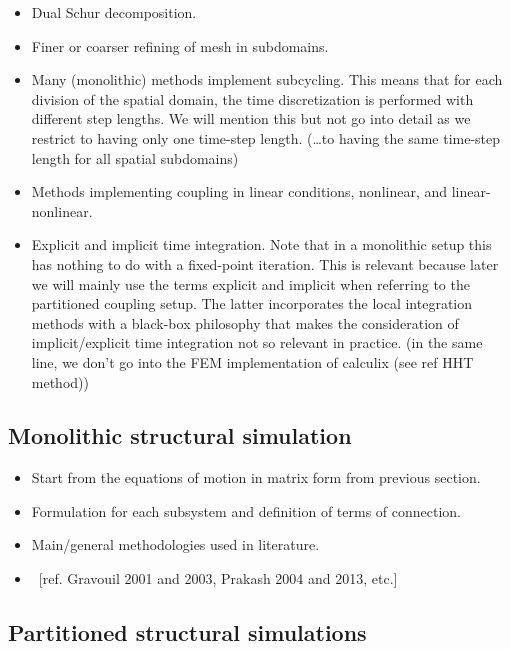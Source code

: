\documentclass[a4paper, 11pt, oneside]{Thesis}  %
\begin{document}
        \begin{itemize}
            \item Dual Schur decomposition. 
            \item Finer or coarser refining of mesh in subdomains.
            \item Many (monolithic) methods implement subcycling. This means that for each division of the spatial domain, the time discretization is performed with different step lengths. We will mention this but not go into detail as we restrict to having only one time-step length. (\ldots to having the same time-step length for all spatial subdomains)
            \item Methods implementing coupling in linear conditions, nonlinear, and linear-nonlinear. 
            \item Explicit and implicit time integration. Note that in a monolithic setup this has nothing to do with a fixed-point iteration. This is relevant because later we will mainly use the terms explicit and implicit when referring to the partitioned coupling setup. The latter incorporates the local integration methods with a black-box philosophy that makes the consideration of implicit/explicit time integration not so relevant in practice. (in the same line, we don't go into the FEM implementation of calculix (see ref HHT method))
        \end{itemize}    
    
        \subsection{Monolithic structural simulation}
        
            \begin{itemize}
                \item Start from the equations of motion in matrix form from previous section.
                \item Formulation for each subsystem and definition of terms of connection.
                \item Main/general methodologies used in literature.
                \item ~[ref. Gravouil 2001 and 2003, Prakash 2004 and 2013, etc.]
            \end{itemize}
            
        \subsection{Partitioned structural simulations}
        
\end{document}
